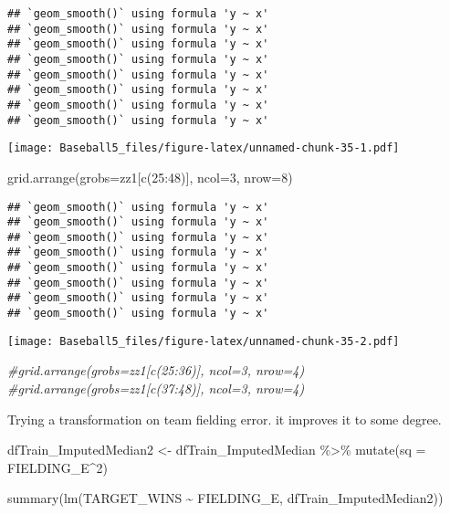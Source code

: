\documentclass[
]{article}
\newenvironment{Shaded}{\begin{snugshade}}{\end{snugshade}}
\newcommand{\AttributeTok}[1]{\textcolor[rgb]{0.77,0.63,0.00}{#1}}
\newcommand{\CommentTok}[1]{\textcolor[rgb]{0.56,0.35,0.01}{\textit{#1}}}
\newcommand{\DecValTok}[1]{\textcolor[rgb]{0.00,0.00,0.81}{#1}}
\newcommand{\FunctionTok}[1]{\textcolor[rgb]{0.00,0.00,0.00}{#1}}
\newcommand{\NormalTok}[1]{#1}
\newcommand{\OtherTok}[1]{\textcolor[rgb]{0.56,0.35,0.01}{#1}}
\newcommand{\SpecialCharTok}[1]{\textcolor[rgb]{0.00,0.00,0.00}{#1}}
\begin{document}
\begin{verbatim}
## `geom_smooth()` using formula 'y ~ x'
## `geom_smooth()` using formula 'y ~ x'
## `geom_smooth()` using formula 'y ~ x'
## `geom_smooth()` using formula 'y ~ x'
## `geom_smooth()` using formula 'y ~ x'
## `geom_smooth()` using formula 'y ~ x'
## `geom_smooth()` using formula 'y ~ x'
## `geom_smooth()` using formula 'y ~ x'
\end{verbatim}

\texttt{[image: Baseball5\_files/figure-latex/unnamed-chunk-35-1.pdf]}

\begin{Shaded}
\begin{Highlighting}[]
\FunctionTok{grid.arrange}\NormalTok{(}\AttributeTok{grobs=}\NormalTok{zz1[}\FunctionTok{c}\NormalTok{(}\DecValTok{25}\SpecialCharTok{:}\DecValTok{48}\NormalTok{)],  }\AttributeTok{ncol=}\DecValTok{3}\NormalTok{, }\AttributeTok{nrow=}\DecValTok{8}\NormalTok{)}
\end{Highlighting}
\end{Shaded}

\begin{verbatim}
## `geom_smooth()` using formula 'y ~ x'
## `geom_smooth()` using formula 'y ~ x'
## `geom_smooth()` using formula 'y ~ x'
## `geom_smooth()` using formula 'y ~ x'
## `geom_smooth()` using formula 'y ~ x'
## `geom_smooth()` using formula 'y ~ x'
## `geom_smooth()` using formula 'y ~ x'
## `geom_smooth()` using formula 'y ~ x'
\end{verbatim}

\texttt{[image: Baseball5\_files/figure-latex/unnamed-chunk-35-2.pdf]}

\begin{Shaded}
\begin{Highlighting}[]
\CommentTok{\#grid.arrange(grobs=zz1[c(25:36)],  ncol=3, nrow=4)}
\CommentTok{\#grid.arrange(grobs=zz1[c(37:48)],  ncol=3, nrow=4)}
\end{Highlighting}
\end{Shaded}

Trying a transformation on team fielding error. it improves it to some
degree.

\begin{Shaded}
\begin{Highlighting}[]
\NormalTok{dfTrain\_ImputedMedian2 }\OtherTok{\textless{}{-}}\NormalTok{ dfTrain\_ImputedMedian }\SpecialCharTok{\%\textgreater{}\%}
  \FunctionTok{mutate}\NormalTok{(}\AttributeTok{sq =}\NormalTok{ FIELDING\_E}\SpecialCharTok{\^{}}\DecValTok{2}\NormalTok{)}

\FunctionTok{summary}\NormalTok{(}\FunctionTok{lm}\NormalTok{(TARGET\_WINS }\SpecialCharTok{\textasciitilde{}}\NormalTok{ FIELDING\_E, dfTrain\_ImputedMedian2))}
\end{Highlighting}
\end{Shaded}
\end{document}
